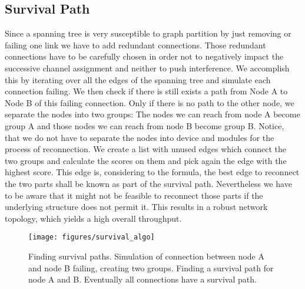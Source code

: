   \subsection{Survival Path}
  Since a spanning tree is very susceptible to graph partition by just removing or failing one link we have to add redundant connections.
  Those redundant connections have to be carefully chosen in order not to negatively impact the successive channel assignment and neither to push interference.
  We accomplish this by iterating over all the edges of the spanning tree and simulate each connection failing. We then check if there is still exists 
  a path from Node A to Node B of this failing connection. Only if there is no path to the other node, we separate the nodes into two groups:
  The nodes we can reach from node A become group A and those nodes we can reach from node B become group B.
  Notice, that we do not have to separate the nodes into device and modules for the process of reconnection.
  We create a list with unused edges which connect the two groups and calculate the scores on them and pick again the edge with the highest score.
  This edge is, considering to the formula, the best edge to reconnect the two parts shall be known as part of the survival path.
  Nevertheless we have to be aware that it might not be feasible to reconnect those parts if the underlying structure does not permit it.
  This results in a robust network topology, which yields a high overall throughput.
  \begin{figure}[htbp]
    \centering
    \texttt{[image: figures/survival\_algo]}
    \caption{Finding survival paths. Simulation of connection between node A and node B failing, creating two groups.
    Finding a survival path for node A and B. Eventually all connections have a survival path.}
    \label{fig:survival_algo}
  \end{figure}

